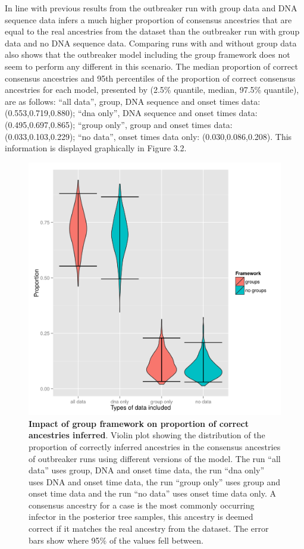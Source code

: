 \documentclass[11pt,a4paper]{report}
\begin{document}
In line with previous results from \citet{outbrkr} the outbreaker run with group data and DNA sequence data infers a much higher proportion of consensus ancestries that are equal to the real ancestries from the dataset than the outbreaker run with group data and no DNA sequence data. Comparing runs with and without group data also shows that the outbreaker model including the group framework does not seem to perform any different in this scenario. The median proportion of correct consensus ancestries and 95th percentiles of the proportion of correct consensus ancestries for each model, presented by (2.5\% quantile, median, 97.5\% quantile), are as follows: ``all data'', group, DNA sequence and onset times data: (0.553,0.719,0.880); ``dna only'', DNA sequence and onset times data: (0.495,0.697,0.865); ``group only'', group and onset times data: (0.033,0.103,0.229); ``no data'', onset times data only: (0.030,0.086,0.208). This information is displayed graphically in Figure 3.2.
\begin{figure}
\centering
\includegraphics[scale=0.6]{final.png}
\newline
\caption{{\bf Impact of group framework on proportion of correct ancestries inferred}. Violin plot showing the distribution of the proportion of correctly inferred ancestries in the consensus ancestries of outbreaker runs using different versions of the model. The run ``all data'' uses group, DNA and onset time data, the run ``dna only'' uses DNA and onset time data, the run ``group only'' uses group and onset time data and the run ``no data'' uses onset time data only. A consensus ancestry for a case is the most commonly occurring infector in the posterior tree samples, this ancestry is deemed correct if it matches the real ancestry from the dataset. The error bars show where 95\% of the values fell between.}

\end{figure}
\end{document}
